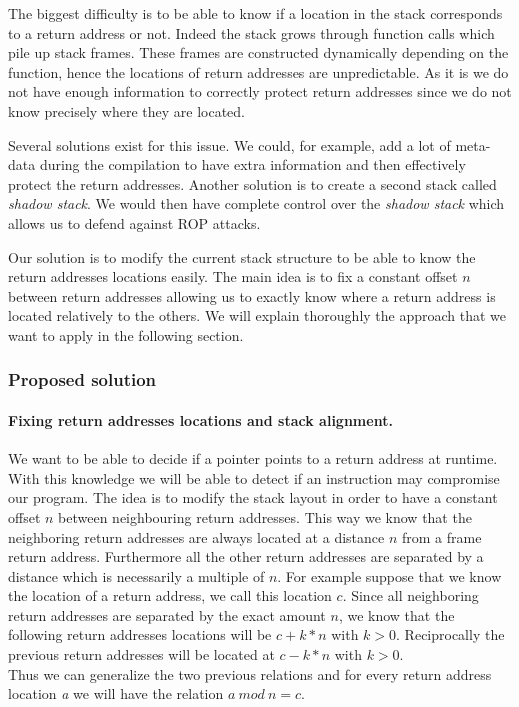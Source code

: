 \documentclass[11pt]{sdm}
\begin{document}
The biggest difficulty is to be able to know if a location in the stack corresponds to a return address or not. Indeed the stack grows through function calls which pile up stack frames. 
These frames are constructed dynamically depending on the function, hence the locations of return addresses are unpredictable.
As it is we do not have enough information to correctly protect return addresses since we do not know precisely where they are located.

Several solutions exist for this issue. We could, for example, add a lot of meta-data during the compilation to have extra information and then effectively protect the return addresses. Another solution is to create a second stack called \textit{shadow stack}. We would then have complete control over the \textit{shadow stack} which allows us to defend against ROP attacks.

Our solution is to modify the current stack structure to be able to know the return addresses locations easily. The main idea is to fix a constant offset $n$ between return addresses allowing us to exactly know where a return address is located relatively to the others. We will explain thoroughly the approach that we want to apply in the following section.

\subsubsection{Proposed solution}

\paragraph{Fixing return addresses locations and stack alignment.}
\label{par:Fixing return addresses locations}

We want to be able to decide if a pointer points to a return address at runtime. With this knowledge we will be able to detect if an instruction may compromise our program.
The idea is to modify the stack layout in order to have a constant offset $n$ between neighbouring return addresses. This way we know that the neighboring return addresses are always located at a distance $n$ from a frame return address. Furthermore all the other return addresses are separated by a distance which is necessarily a multiple of $n$.
For example suppose that we know the location of a return address, we call this location $c$.
Since all neighboring return addresses are separated by the exact amount $n$, we know that the following return addresses locations will be $c+k*n$ with $k>0$. Reciprocally the previous return addresses will be located at $c-k*n$ with $k>0$.\\
Thus we can generalize the two previous relations and for every return address location \textit{a} we will have the relation $a~mod~n = c$.
\end{document}
